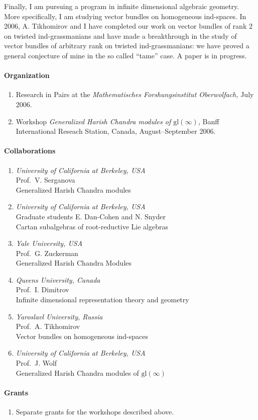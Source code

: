 Finally, I am pursuing a program in infinite dimensional algebraic
geometry. More specifically, I am studying vector bundles on
homogeneous ind-spaces. In 2006, A. Tikhomirov and I have completed
our work on vector bundles of rank 2 on twisted ind-grassmanians and
have made a breakthrough in the study of vector bundles of arbitrary
rank on twisted ind-grassmanians: we have proved a general conjecture
of mine in the so called ``tame'' case. A paper is in progress.


\paragraph{Organization}
\begin{enumerate}
\item Research in Pairs at the {\sl Mathematisches Forshungsinstitut Oberwolfach,} July 2006.
\item Workshop {\em Generalized Harish Chandra modules of $\mathrm{gl}(\infty)$,} Banff International Reseach Station, Canada, August--September 2006.
\end{enumerate}

\paragraph{Collaborations}
\begin{enumerate}
\item {\sl University of California at Berkeley, USA} \\ 
  Prof.~V. Serganova \\
  Generalized Harish Chandra modules
\item {\sl University of California at Berkeley, USA} \\
  Graduate students E. Dan-Cohen and N. Snyder \\
  Cartan subalgebras of root-reductive Lie algebras
\item {\sl Yale University, USA} \\
  Prof.~G. Zuckerman \\
  Generalized Harish Chandra Modules
\item {\sl Queens University, Canada} \\
  Prof.~I. Dimitrov \\
  Infinite dimensional representation theory and geometry
\item {\sl Yaroslavl University, Russia} \\
  Prof.~A. Tikhomirov \\
  Vector bundles on homogeneous ind-spaces
\item {\sl University of California at Berkeley, USA} \\
  Prof.~J. Wolf \\
  Generalized Harish Chandra modules of $\mathrm{gl}(\infty)$
\end{enumerate}

\paragraph{Grants}
\begin{enumerate}
\item
Separate grants for the workshops described above.
\end{enumerate}
\nocite{Penkov1key}
\nocite{Penkov2key}
